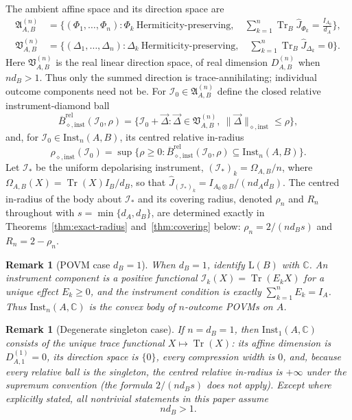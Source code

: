 \documentclass[11pt,a4paper]{article}
\newtheorem{remark}[theorem]{Remark}
\newcommand{\Lin}{\mathrm{L}}
\newcommand{\Inst}{\mathrm{Inst}}
\newcommand{\Tr}{\operatorname{Tr}}
\newcommand{\Jhat}{\widehat J}
\newcommand{\vD}{\vec{\Delta}}
\begin{document}
The ambient affine space and its direction space are
\begin{align*}
\mathfrak A_{A,B}^{(n)}
&=\Big\{(\Phi_1,\dots,\Phi_n):
\Phi_k\ \text{Hermiticity-preserving},\quad
\sum_{k=1}^n\Tr_B\Jhat_{\Phi_k}=\frac{I_{A_0}}{d_A}\Big\},\\
\mathfrak V_{A,B}^{(n)}
&=\Big\{(\Delta_1,\dots,\Delta_n):
\Delta_k\ \text{Hermiticity-preserving},\quad
\sum_{k=1}^n\Tr_B\Jhat_{\Delta_k}=0\Big\}.
\end{align*}
Here $\mathfrak V_{A,B}^{(n)}$ is the real linear direction space, of real dimension $D_{A,B}^{(n)}$ when $nd_B>1$.
Thus only the summed direction is trace-annihilating; individual outcome components need not be. For $\mathcal I_0\in\mathfrak A_{A,B}^{(n)}$ define the closed relative instrument-diamond ball
\[
\overline B_{\diamond,\mathrm{inst}}^{\mathrm{rel}}(\mathcal I_0,\rho)
=\big\{\mathcal I_0+\vD:\vD\in\mathfrak V_{A,B}^{(n)},\ \|\vD\|_{\diamond,\mathrm{inst}}\le\rho\big\},
\]
and, for $\mathcal I_0\in\Inst_n(A,B)$, its centred relative in-radius
\[
\rho_{\diamond,\mathrm{inst}}(\mathcal I_0)
=\sup\Big\{\rho\ge0:
\overline B_{\diamond,\mathrm{inst}}^{\mathrm{rel}}(\mathcal I_0,\rho)
\subseteq\Inst_n(A,B)\Big\}.
\]
Let $\mathcal I_*$ be the uniform depolarising instrument, $(\mathcal I_*)_k=\Omega_{A,B}/n$, where $\Omega_{A,B}(X)=\Tr(X)I_B/d_B$, so that $\Jhat_{(\mathcal I_*)_k}=I_{A_0\otimes B}/(n d_Ad_B)$. The centred in-radius of the body about $\mathcal I_*$ and its covering radius, denoted $\rho_n$ and $R_n$ throughout with $s=\min\{d_A,d_B\}$, are determined exactly in Theorems~\ref{thm:exact-radius} and~\ref{thm:covering} below: $\rho_n=2/(nd_Bs)$ and $R_n=2-\rho_n$.

\begin{remark}[POVM case $d_B=1$]
\label{rem:povm}
When $d_B=1$, identify $\Lin(B)$ with $\mathbb C$. An instrument component is a positive functional $\mathcal I_k(X)=\Tr(E_kX)$ for a unique effect $E_k\ge0$, and the instrument condition is exactly $\sum_{k=1}^nE_k=I_A$. Thus $\Inst_n(A,\mathbb C)$ is the convex body of $n$-outcome POVMs on $A$.
\end{remark}

\begin{remark}[Degenerate singleton case]
\label{rem:degenerate}
If $n=d_B=1$, then $\Inst_1(A,\mathbb C)$ consists of the unique trace functional $X\mapsto\Tr(X)$: its affine dimension is $D_{A,1}^{(1)}=0$, its direction space is $\{0\}$, every compression width is $0$, and, because every relative ball is the singleton, the centred relative in-radius is $+\infty$ under the supremum convention (the formula $2/(nd_Bs)$ does not apply). Except where explicitly stated, all nontrivial statements in this paper assume
\[
n d_B>1.
\]
\end{remark}
\end{document}
